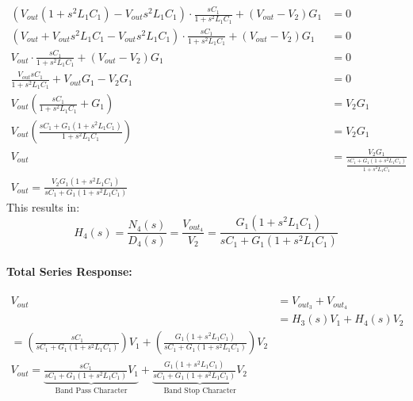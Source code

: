 \begin{enumerate}
\begin{enumerate}
\begin{align*}
            \left(V_{out}(1 + s^2 L_1 C_1) - V_{out}s^2 L_1 C_1\right) \cdot \frac{sC_1}{1 + s^2 L_1 C_1} + (V_{out} - V_{2}){G_1} &= 0 \\
            \left(V_{out} + V_{out}s^2 L_1 C_1 - V_{out}s^2 L_1 C_1\right) \cdot \frac{sC_1}{1 + s^2 L_1 C_1} + (V_{out} - V_{2}){G_1} &= 0 \\
            V_{out} \cdot \frac{sC_1}{1 + s^2 L_1 C_1} + (V_{out} - V_{2}){G_1} &= 0 \\
            \frac{V_{out} sC_1}{1 + s^2 L_1 C_1} + V_{out}G_1 - V_{2}G_1 &= 0 \\
            V_{out}\left(\frac{sC_1}{1 + s^2 L_1 C_1} + G_1\right) &= V_{2}G_1 \\
            V_{out}\left(\frac{sC_1 + G_1(1 + s^2 L_1 C_1)}{1 + s^2 L_1 C_1}\right) &= V_{2}G_1 \\
            V_{out} &= \frac{V_{2}G_1}{\frac{sC_1 + G_1(1 + s^2 L_1 C_1)}{1 + s^2 L_1 C_1}} \\
            V_{out} = \frac{V_{2}G_1(1 + s^2 L_1 C_1)}{sC_1 + G_1(1 + s^2 L_1 C_1)}
          \end{align*}
          This results in:
          \[
            H_4(s) = \frac{N_4(s)}{D_4(s)} = \frac{V_{out_4}}{V_{2}} = \frac{G_1(1 + s^2 L_1 C_1)}{sC_1 + G_1(1 + s^2 L_1 C_1)}
          \]
      \end{enumerate}
    \paragraph{Total Series Response:}
      \begin{align*}
        V_{out} &= V_{out_3} + V_{out_4} \\
                &= H_3(s)V_{1} + H_4(s)V_{2} \\
                = \left(\frac{sC_1}{sC_1 + G_1(1 + s^2 L_1 C_1)}\right)V_{1} + \left(\frac{G_1(1 + s^2 L_1 C_1)}{sC_1 + G_1(1 + s^2 L_1 C_1)}\right)V_{2} \\
        V_{out} = \underbrace{\frac{sC_1}{sC_1 + G_1(1 + s^2 L_1 C_1)}V_{1}}_{\text{Band Pass Character}} + \underbrace{\frac{G_1(1 + s^2 L_1 C_1)}{sC_1 + G_1(1 + s^2 L_1 C_1)}V_{2}}_{\text{Band Stop Character}}
      \end{align*}
\end{enumerate}

